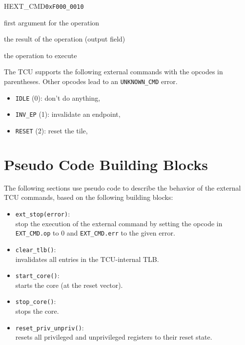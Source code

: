\begin{register}{H}{EXT\_CMD}{\texttt{0xF000\_0010}}
  \regnewline%
  \begin{regdesc}\begin{reglist}
    \item[arg0] first argument for the operation
    \item[err] the result of the operation (output field)
    \item[op] the operation to execute
  \end{reglist}\end{regdesc}
\end{register}

The TCU supports the following external commands with the opcodes in parentheses. Other opcodes lead
to an \texttt{UNKNOWN\_CMD} error.

\begin{itemize}
  \item \texttt{IDLE} (0): don't do anything,
  \item \texttt{INV\_EP} (1): invalidate an endpoint,
  \item \texttt{RESET} (2): reset the tile,
\end{itemize}

\section{Pseudo Code Building Blocks}
\label{sec:extcmdspseudo}

The following sections use pseudo code to describe the behavior of the external TCU commands, based
on the following building blocks:

\begin{itemize}
  \item \texttt{ext\_stop(error)}:\\
  stop the execution of the external command by setting the opcode in \texttt{EXT\_CMD.op} to 0 and
  \texttt{EXT\_CMD.err} to the given error.
  \item \texttt{clear\_tlb()}:\\
  invalidates all entries in the TCU-internal TLB.
  \item \texttt{start\_core()}:\\
  starts the core (at the reset vector).
  \item \texttt{stop\_core()}:\\
  stops the core.
  \item \texttt{reset\_priv\_unpriv()}:\\
  resets all privileged and unprivileged registers to their reset state.
\end{itemize}

